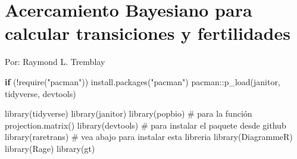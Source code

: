 \documentclass[
  12pt,
  letterpaper,
]{book}
\author{}
\date{}
\newenvironment{Shaded}{\begin{snugshade}}{\end{snugshade}}
\newcommand{\CommentTok}[1]{\textcolor[rgb]{0.37,0.37,0.37}{#1}}
\newcommand{\ControlFlowTok}[1]{\textcolor[rgb]{0.00,0.23,0.31}{\textbf{#1}}}
\newcommand{\FunctionTok}[1]{\textcolor[rgb]{0.28,0.35,0.67}{#1}}
\newcommand{\NormalTok}[1]{\textcolor[rgb]{0.00,0.23,0.31}{#1}}
\newcommand{\SpecialCharTok}[1]{\textcolor[rgb]{0.37,0.37,0.37}{#1}}
\newcommand{\StringTok}[1]{\textcolor[rgb]{0.13,0.47,0.30}{#1}}
\renewcommand*\contentsname{Table of contents}
\newcommand\contentsname{Table of contents}
\begin{document}
\frontmatter

\renewcommand*\contentsname{Table of contents}
{
\hypersetup{linkcolor=}
\setcounter{tocdepth}{2}
\tableofcontents
}

\mainmatter
\chapter{Acercamiento Bayesiano para calcular transiciones y
fertilidades}\label{acercamiento-bayesiano-para-calcular-transiciones-y-fertilidades}

Por: Raymond L. Tremblay

\begin{Shaded}
\begin{Highlighting}[]
\ControlFlowTok{if}\NormalTok{ (}\SpecialCharTok{!}\FunctionTok{require}\NormalTok{(}\StringTok{"pacman"}\NormalTok{)) }\FunctionTok{install.packages}\NormalTok{(}\StringTok{"pacman"}\NormalTok{)}
\NormalTok{pacman}\SpecialCharTok{::}\FunctionTok{p\_load}\NormalTok{(janitor, tidyverse, devtools)}

\FunctionTok{library}\NormalTok{(tidyverse)}
\FunctionTok{library}\NormalTok{(janitor)}
\FunctionTok{library}\NormalTok{(popbio) }\CommentTok{\# para la función projection.matrix()}
\FunctionTok{library}\NormalTok{(devtools) }\CommentTok{\# para instalar el paquete desde github}
\FunctionTok{library}\NormalTok{(raretrans) }\CommentTok{\# vea abajo para instalar esta libreria}
\FunctionTok{library}\NormalTok{(DiagrammeR)}
\FunctionTok{library}\NormalTok{(Rage)}
\FunctionTok{library}\NormalTok{(gt)}
\end{Highlighting}
\end{Shaded}
\end{document}
